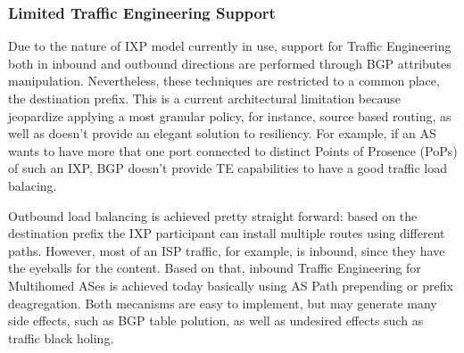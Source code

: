 \documentclass[12pt]{article}
\begin{document}
\subsubsection{Limited Traffic Engineering Support}
\label{subsec:traficeng}

Due to the nature of IXP model currently in use, support for Traffic Engineering both in inbound and outbound directions are performed through BGP attributes manipulation. Nevertheless, these techniques are restricted to a common place, the destination prefix. This is a current architectural limitation because jeopardize applying a most granular policy, for instance, source based routing, as well as doesn't provide an elegant solution to resiliency. For example, if an AS wants to have more that one port connected to distinct Points of Prosence (PoPs) of such an IXP, BGP doesn't provide TE capabilities to have a good traffic load balacing.


Outbound load balancing is achieved pretty straight forward: based on the destination prefix the IXP participant can install multiple routes using different paths. However, most of an ISP traffic, for example, is inbound, since they have the eyeballs for the content. Based on that, inbound Traffic Engineering for Multihomed ASes is achieved today basically using AS Path prepending or prefix deagregation. Both mecanisms are easy to implement, but may generate many side effects, such as BGP table polution, as well as undesired effects such as traffic black holing.
\end{document}
